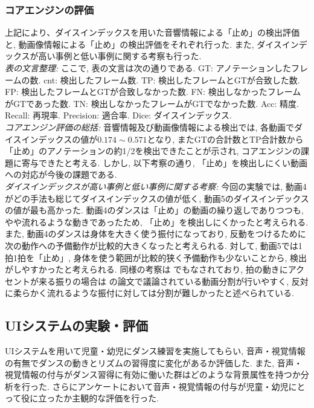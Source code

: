 \documentclass[paper]{ieicej}
\begin{document}
\subsubsection{コアエンジンの評価}
上記により、ダイスインデックスを用いた音響情報による「止め」の検出評価と, 動画像情報による「止め」の検出評価をそれぞれ行った. また, ダイスインデックスが高い事例と低い事例に関する考察も行った. \\
\emph{表の文言整理: }ここで, 表の文言は次の通りである. GT: アノテーションしたフレームの数. cnt: 検出したフレーム数. TP: 検出したフレームとGTが合致した数. FP: 検出したフレームとGTが合致しなかった数. FN: 検出しなかったフレームがGTであった数. TN: 検出しなかったフレームがGTでなかった数. Acc: 精度. Recall: 再現率. Precision: 適合率. Dice: ダイスインデックス.\\
\emph{コアエンジン評価の総括: }音響情報及び動画像情報による検出では, 各動画でダイスインデックスの値が$0.174\sim0.571$となり, またGTの合計数とTP合計数から「止め」のアノテーションの約1/2を検出できたことが示され, コアエンジンの課題に寄与できたと考える. しかし, 以下考察の通り, 「止め」を検出しにくい動画への対応が今後の課題である.\\
\emph{ダイスインデックスが高い事例と低い事例に関する考察: }今回の実験では, 動画4がどの手法も総じてダイスインデックスの値が低く, 動画5のダイスインデックスの値が最も高かった. 動画4のダンスは「止め」の動画の繰り返しでありつつも, やや流れるような動きであったため, 「止め」を検出しにくかったと考えられる. また, 動画4のダンスは身体を大きく使う振付になっており, 反動をつけるために次の動作への予備動作が比較的大きくなったと考えられる. 対して, 動画5では1拍1拍を「止め」, 身体を使う範囲が比較的狭く予備動作も少ないことから, 検出がしやすかったと考えられる. 同様の考察は \cite{ref16}でもなされており, 拍の動きにアクセントが来る振りの場合は \cite{ref16}の論文で議論されている動画分割が行いやすく, 反対に柔らかく流れるような振付に対しては分割が難しかったと述べられている. 
\subsection{UIシステムの実験・評価}
UIシステムを用いて児童・幼児にダンス練習を実施してもらい, 音声・視覚情報の有無でダンスの動きとリズムの習得度に変化があるか評価した. また, 音声・視覚情報の付与がダンス習得に有効に働いた群はどのような背景属性を持つか分析を行った. さらにアンケートにおいて音声・視覚情報の付与が児童・幼児にとって役に立ったか主観的な評価を行った. 
\end{document}
